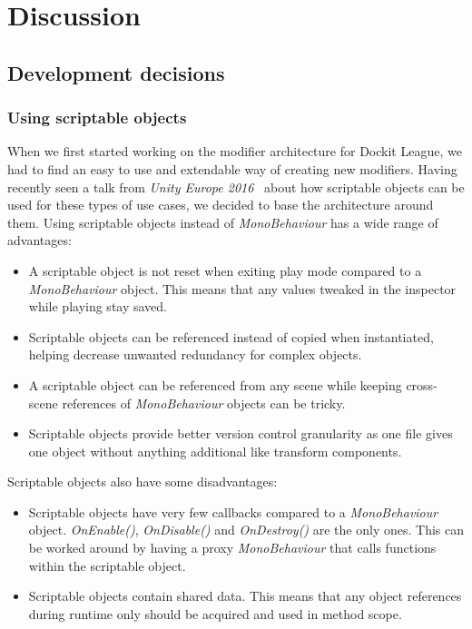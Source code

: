 \chapter{Discussion}
\label{chap:discussion}

\section{Development decisions}
\subsection{Using scriptable objects}
\label{sec:scriptableObjects}
When we first started working on the modifier architecture for Dockit League, we had to find an easy to use and extendable way of creating new modifiers. Having recently seen a talk from \emph{Unity Europe 2016}~\cite{scriptableObjectsTalk} about how scriptable objects can be used for these types of use cases, we decided to base the architecture around them. Using scriptable objects instead of \emph{MonoBehaviour} has a wide range of advantages:
\begin{itemize}
    \item A scriptable object is not reset when exiting play mode compared to a \emph{MonoBehaviour} object. This means that any values tweaked in the inspector while playing stay saved.
    \item Scriptable objects can be referenced instead of copied when instantiated, helping decrease unwanted redundancy for complex objects. 
    \item A scriptable object can be referenced from any scene while keeping cross-scene references of \emph{MonoBehaviour} objects can be tricky. 
    \item Scriptable objects provide better version control granularity as one file gives one object without anything additional like transform components. 
\end{itemize}

Scriptable objects also have some disadvantages:
\begin{itemize}
    \item Scriptable objects have very few callbacks compared to a \emph{MonoBehaviour} object. \emph{OnEnable()}, \emph{OnDisable()} and \emph{OnDestroy()} are the only ones. This can be worked around by having a proxy \emph{MonoBehaviour} that calls functions within the scriptable object. 
    \item Scriptable objects contain shared data. This means that any object references during runtime only should be acquired and used in method scope. 
\end{itemize}


